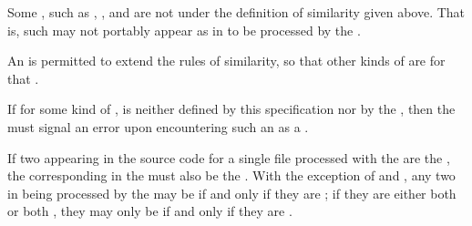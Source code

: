 \endlist

\endsubsubsubsection%

\endsubsubsection%


Some , such as , , and 
are not  under the definition of similarity given above.
That is, such  may not portably appear as   
in  to be processed by the . 

An  is permitted to extend the rules of similarity, 
so that other kinds of  are 
for that .

If for some kind of ,  is
neither defined by this specification 
	    nor by the , 
then the  must signal an error upon encountering such 
an  as a .

\endsubsubsection%
  


If two  appearing in the source code for a single file
processed with
the  
are the ,
the corresponding  in the  
must also be the .
With the exception of  and , any two
in  being processed by
the 
may be  
if and only if they are ; 
if they are either both  or both ,
they may only be  if and only if they are .

